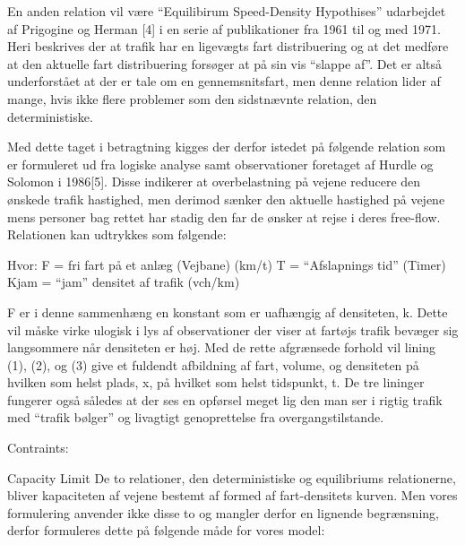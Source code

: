 En anden relation vil være “Equilibirum Speed-Density Hypothises” udarbejdet af Prigogine og Herman [4] i en serie af publikationer fra 1961 til og med 1971. Heri beskrives der at trafik har en ligevægts fart distribuering og at det medføre at den aktuelle fart distribuering forsøger at på sin vis “slappe af”. Det er altså underforstået at der er tale om en gennemsnitsfart, men denne relation lider af mange, hvis ikke flere problemer som den sidstnævnte relation, den deterministiske.

Med dette taget i betragtning kigges der derfor istedet på følgende relation som er formuleret ud fra logiske analyse samt observationer foretaget af Hurdle og Solomon i 1986[5]. Disse indikerer at overbelastning på vejene reducere den ønskede trafik hastighed, men derimod sænker den aktuelle hastighed på vejene mens personer bag rettet har stadig den far de ønsker at rejse i deres free-flow. Relationen kan udtrykkes som følgende:


Hvor:
F = fri fart på et anlæg (Vejbane) (km/t)
T = “Afslapnings tid” (Timer)
Kjam = “jam” densitet af trafik (vch/km)

F er i denne sammenhæng en konstant som er uafhængig af densiteten, k. Dette vil måske virke ulogisk i lys af observationer der viser at fartøjs trafik bevæger sig langsommere når densiteten er høj. Med de rette afgrænsede forhold vil lining (1), (2), og (3) give et fuldendt afbildning af fart, volume, og densiteten på hvilken som helst plads, x, på hvilket som helst tidspunkt, t. De tre lininger fungerer også således at der ses en opførsel meget lig den man ser i rigtig trafik med “trafik bølger” og livagtigt genoprettelse fra overgangstilstande.

Contraints:

Capacity Limit
De to relationer, den deterministiske og equilibriums relationerne, bliver kapaciteten af vejene bestemt af formed af fart-densitets kurven. Men vores formulering anvender ikke disse to og mangler derfor en lignende begrænsning, derfor formuleres dette på følgende måde for vores model: 


